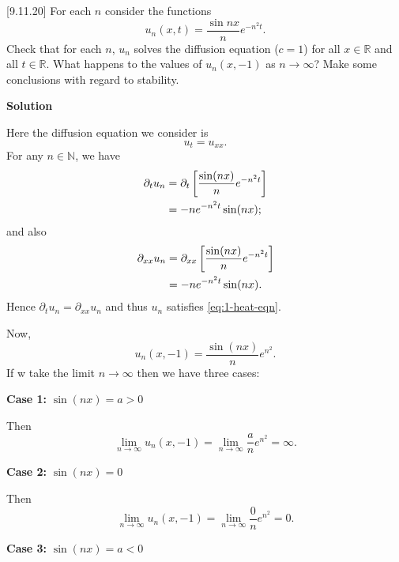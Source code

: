 \documentclass{article}
\begin{document}
\vspace{5mm}

[9.11.20] For each $n$ consider the functions
%
\begin{equation*}
    u_n(x, t) = \frac{\sin n x}{n} e^{-n^2 t}
    .
\end{equation*}
%
Check that for each $n$, $u_n$ solves the diffusion equation ($c = 1$)
for all $x \in \mathbb{R}$ and all $t \in \mathbb{R}$. What happens to
the values of $u_n(x, -1)$ as $n \to \infty$? Make some conclusions with
regard to stability.

\textbf{Solution}

Here the diffusion equation we consider is
%
\begin{equation}
    u_t = u_{xx}
    .
    \label{eq:1-heat-eqn}
\end{equation}
%
For any $n \in \mathbb{N}$, we have
%
\begin{align*}
    \partial_t u_n
        &= \partial_t \sbr{\frac{\sin(n x)}{n} e^{-n^2 t}} \\
        &= - n e^{-n^2 t} \sin(n x)
        ;
\end{align*}
%
and also
%
\begin{align*}
    \partial_{xx} u_n
        &= \partial_{xx} \sbr{\frac{\sin(n x)}{n} e^{-n^2 t}} \\
        &= - n e^{-n^2 t} \sin(n x)
        .
\end{align*}
%
Hence $\partial_t u_n = \partial_{xx} u_n$ and thus $u_n$ satisfies
\eqref{eq:1-heat-eqn}.

Now,
%
\begin{equation*}
    u_n(x, -1) = \frac{\sin(n x)}{n} e^{n^2}
    .
\end{equation*}
%
If w take the limit $n \to \infty$ then we have three cases:

\textbf{Case 1:} $\sin(n x) = a > 0$

Then
%
\begin{equation*}
    \lim_{n \to \infty} u_n(x, -1)
        = \lim_{n \to \infty} \frac{a}{n} e^{n^2}
        = \infty
    .
\end{equation*}

\textbf{Case 2:} $\sin(n x) = 0$

Then
%
\begin{equation*}
    \lim_{n \to \infty} u_n(x, -1)
        = \lim_{n \to \infty} \frac{0}{n} e^{n^2}
        = 0
    .
\end{equation*}

\textbf{Case 3:} $\sin(n x) = a < 0$
\end{document}
